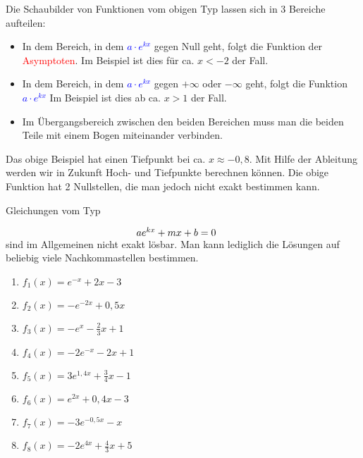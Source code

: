 Die Schaubilder von Funktionen vom obigen Typ lassen sich in 3 Bereiche aufteilen:
\begin{itemize}
	\item In dem Bereich, in dem \textcolor{blue}{\(a\cdot e^{kx}\)} gegen Null geht, folgt die Funktion der \textcolor{red}{Asymptoten}. Im Beispiel ist dies für ca. \(x<-2\) der Fall.
	\item In dem Bereich, in dem \textcolor{blue}{\(a\cdot e^{kx}\)} gegen \(+\infty\) oder \(-\infty\) geht, folgt die Funktion \textcolor{blue}{\(a\cdot e^{kx}\)} Im Beispiel ist dies ab ca. \(x>1\) der Fall.
	\item Im Übergangsbereich zwischen den beiden Bereichen muss man die beiden Teile mit einem Bogen miteinander verbinden.
\end{itemize}
Das obige Beispiel hat einen Tiefpunkt bei ca. \(x\approx -0,8\). Mit Hilfe der Ableitung werden wir in Zukunft Hoch- und Tiefpunkte berechnen können. Die obige Funktion hat 2 Nullstellen, die man jedoch nicht exakt bestimmen kann.
\begin{tcolorbox}
	Gleichungen vom Typ

	$\makebox[\linewidth]{\(ae^{kx}+mx+b=0\)}$
	sind im Allgemeinen nicht exakt lösbar. Man kann lediglich die Lösungen auf beliebig viele Nachkommastellen bestimmen.
\end{tcolorbox}
\newpage
\begin{Exercise}[title={Skizziere die Asymptote, den Teil mit \(ae^{kx}\) sowie das Schaubild der Funktion.}, label=schAsyA1]

    \begin{minipage}{\textwidth}
		\begin{enumerate}[label=\alph*)]
			\item \(f_1(x)=e^{-x}+2x-3\)
			\item \(f_2(x)=-e^{-2x}+0,5x\)
			\item \(f_3(x)=-e^{x}-\frac{2}{3}x+1\)
			\item \(f_4(x)=-2e^{-x}-2x+1\)
			\item \(f_5(x)=3e^{1,4x}+\frac{3}{4}x-1\)
			\item \(f_6(x)=e^{2x}+0,4x-3\)
			\item \(f_7(x)=-3e^{-0,5x}-x\)
			\item \(f_8(x)=-2e^{4x}+\frac{4}{3}x+5\)
		\end{enumerate}
    \end{minipage}
\end{Exercise}
